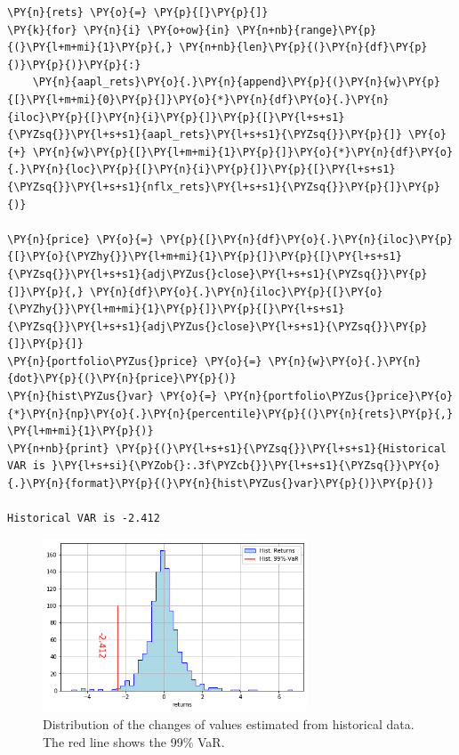 \begin{codebox}
\begin{Verbatim}[commandchars=\\\{\}]
\PY{n}{rets} \PY{o}{=} \PY{p}{[}\PY{p}{]}
\PY{k}{for} \PY{n}{i} \PY{o+ow}{in} \PY{n+nb}{range}\PY{p}{(}\PY{l+m+mi}{1}\PY{p}{,} \PY{n+nb}{len}\PY{p}{(}\PY{n}{df}\PY{p}{)}\PY{p}{)}\PY{p}{:}
    \PY{n}{aapl_rets}\PY{o}{.}\PY{n}{append}\PY{p}{(}\PY{n}{w}\PY{p}{[}\PY{l+m+mi}{0}\PY{p}{]}\PY{o}{*}\PY{n}{df}\PY{o}{.}\PY{n}{iloc}\PY{p}{[}\PY{n}{i}\PY{p}{]}\PY{p}{[}\PY{l+s+s1}{\PYZsq{}}\PY{l+s+s1}{aapl_rets}\PY{l+s+s1}{\PYZsq{}}\PY{p}{]} \PY{o}{+} \PY{n}{w}\PY{p}{[}\PY{l+m+mi}{1}\PY{p}{]}\PY{o}{*}\PY{n}{df}\PY{o}{.}\PY{n}{loc}\PY{p}{[}\PY{n}{i}\PY{p}{]}\PY{p}{[}\PY{l+s+s1}{\PYZsq{}}\PY{l+s+s1}{nflx_rets}\PY{l+s+s1}{\PYZsq{}}\PY{p}{]}\PY{p}{)}
		
\PY{n}{price} \PY{o}{=} \PY{p}{[}\PY{n}{df}\PY{o}{.}\PY{n}{iloc}\PY{p}{[}\PY{o}{\PYZhy{}}\PY{l+m+mi}{1}\PY{p}{]}\PY{p}{[}\PY{l+s+s1}{\PYZsq{}}\PY{l+s+s1}{adj\PYZus{}close}\PY{l+s+s1}{\PYZsq{}}\PY{p}{]}\PY{p}{,} \PY{n}{df}\PY{o}{.}\PY{n}{iloc}\PY{p}{[}\PY{o}{\PYZhy{}}\PY{l+m+mi}{1}\PY{p}{]}\PY{p}{[}\PY{l+s+s1}{\PYZsq{}}\PY{l+s+s1}{adj\PYZus{}close}\PY{l+s+s1}{\PYZsq{}}\PY{p}{]}\PY{p}{]}
\PY{n}{portfolio\PYZus{}price} \PY{o}{=} \PY{n}{w}\PY{o}{.}\PY{n}{dot}\PY{p}{(}\PY{n}{price}\PY{p}{)}
\PY{n}{hist\PYZus{}var} \PY{o}{=} \PY{n}{portfolio\PYZus{}price}\PY{o}{*}\PY{n}{np}\PY{o}{.}\PY{n}{percentile}\PY{p}{(}\PY{n}{rets}\PY{p}{,} \PY{l+m+mi}{1}\PY{p}{)}
\PY{n+nb}{print} \PY{p}{(}\PY{l+s+s1}{\PYZsq{}}\PY{l+s+s1}{Historical VAR is }\PY{l+s+si}{\PYZob{}:.3f\PYZcb{}}\PY{l+s+s1}{\PYZsq{}}\PY{o}{.}\PY{n}{format}\PY{p}{(}\PY{n}{hist\PYZus{}var}\PY{p}{)}\PY{p}{)}

Historical VAR is -2.412
\end{Verbatim}
\end{codebox}

\begin{figure}[htb]
	\centering
	\includegraphics[width=0.7\textwidth]{figures/historical_var.png}
	\caption{Distribution of the changes of values estimated from historical data. 
		The red line shows the 99\% VaR.}
	\label{fig:hist_var}
\end{figure}

